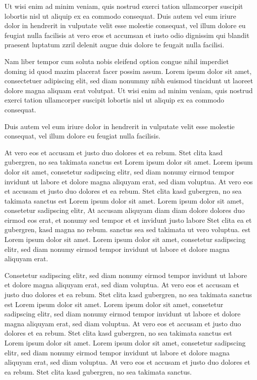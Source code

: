 \documentclass[]{../metanetpaper}
\begin{document}
\begin{Parallel}[c]{80mm}{80mm}
{    Ut wisi enim ad minim veniam, quis nostrud exerci tation ullamcorper suscipit lobortis nisl ut aliquip ex ea commodo consequat. Duis autem vel eum iriure dolor in hendrerit in vulputate velit esse molestie consequat, vel illum dolore eu feugiat nulla facilisis at vero eros et accumsan et iusto odio dignissim qui blandit praesent luptatum zzril delenit augue duis dolore te feugait nulla facilisi.   

    Nam liber tempor cum soluta nobis eleifend option congue nihil imperdiet doming id quod mazim placerat facer possim assum. Lorem ipsum dolor sit amet, consectetuer adipiscing elit, sed diam nonummy nibh euismod tincidunt ut laoreet dolore magna aliquam erat volutpat. Ut wisi enim ad minim veniam, quis nostrud exerci tation ullamcorper suscipit lobortis nisl ut aliquip ex ea commodo consequat.   

    Duis autem vel eum iriure dolor in hendrerit in vulputate velit esse molestie consequat, vel illum dolore eu feugiat nulla facilisis.   

    At vero eos et accusam et justo duo dolores et ea rebum. Stet clita kasd gubergren, no sea takimata sanctus est Lorem ipsum dolor sit amet. Lorem ipsum dolor sit amet, consetetur sadipscing elitr, sed diam nonumy eirmod tempor invidunt ut labore et dolore magna aliquyam erat, sed diam voluptua. At vero eos et accusam et justo duo dolores et ea rebum. Stet clita kasd gubergren, no sea takimata sanctus est Lorem ipsum dolor sit amet. Lorem ipsum dolor sit amet, consetetur sadipscing elitr, At accusam aliquyam diam diam dolore dolores duo eirmod eos erat, et nonumy sed tempor et et invidunt justo labore Stet clita ea et gubergren, kasd magna no rebum. sanctus sea sed takimata ut vero voluptua. est Lorem ipsum dolor sit amet. Lorem ipsum dolor sit amet, consetetur sadipscing elitr, sed diam nonumy eirmod tempor invidunt ut labore et dolore magna aliquyam erat.   

    Consetetur sadipscing elitr, sed diam nonumy eirmod tempor invidunt ut labore et dolore magna aliquyam erat, sed diam voluptua. At vero eos et accusam et justo duo dolores et ea rebum. Stet clita kasd gubergren, no sea takimata sanctus est Lorem ipsum dolor sit amet. Lorem ipsum dolor sit amet, consetetur sadipscing elitr, sed diam nonumy eirmod tempor invidunt ut labore et dolore magna aliquyam erat, sed diam voluptua. At vero eos et accusam et justo duo dolores et ea rebum. Stet clita kasd gubergren, no sea takimata sanctus est Lorem ipsum dolor sit amet. Lorem ipsum dolor sit amet, consetetur sadipscing elitr, sed diam nonumy eirmod tempor invidunt ut labore et dolore magna aliquyam erat, sed diam voluptua. At vero eos et accusam et justo duo dolores et ea rebum. Stet clita kasd gubergren, no sea takimata sanctus.   

}
\end{Parallel}
\end{document}
